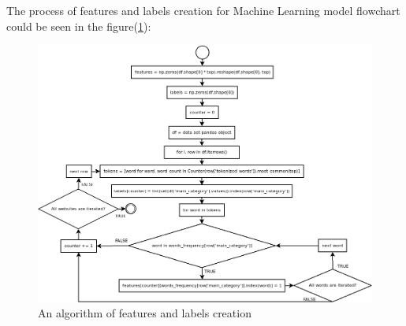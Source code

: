 The process of features and labels creation for Machine Learning model flowchart could be seen in the figure(\ref{fig:features_labels_creation}):
\begin{figure}[H]
    \centering
    \includegraphics[width=1.085\textwidth]{Pictures/features_labels_creation.png}
    \caption{\label{fig:features_labels_creation}{} An algorithm of features and labels creation}
\end{figure}


